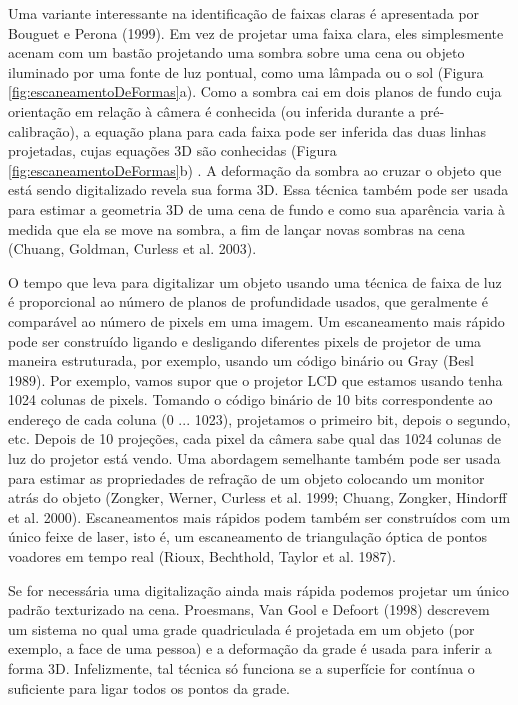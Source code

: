 \documentclass{article}
\begin{document}
Uma variante interessante na identificação de faixas claras é apresentada por Bouguet e Perona (1999). Em vez de projetar uma faixa clara, eles simplesmente acenam com um bastão projetando uma sombra sobre uma cena ou objeto iluminado por uma fonte de luz pontual, como uma lâmpada ou o sol (Figura \ref{fig:escaneamentoDeFormas}a). Como a sombra cai em dois planos de fundo cuja orientação em relação à câmera é conhecida (ou inferida durante a pré-calibração), a equação plana para cada faixa pode ser inferida das duas linhas projetadas, cujas equações 3D são conhecidas (Figura \ref{fig:escaneamentoDeFormas}b) . A deformação da sombra ao cruzar o objeto que está sendo digitalizado revela sua forma 3D. Essa técnica também pode ser usada para estimar a geometria 3D de uma cena de fundo e como sua aparência varia à medida que ela se move na sombra, a fim de lançar novas sombras na cena (Chuang, Goldman, Curless et al. 2003).

O tempo que leva para digitalizar um objeto usando uma técnica de faixa de luz é proporcional ao número de planos de profundidade usados, que geralmente é comparável ao número de pixels em uma imagem. Um escaneamento mais rápido pode ser construído ligando e desligando diferentes pixels de projetor de uma maneira estruturada, por exemplo, usando um código binário ou Gray (Besl 1989). Por exemplo, vamos supor que o projetor LCD que estamos usando tenha 1024 colunas de pixels. Tomando o código binário de 10 bits correspondente ao endereço de cada coluna (0 ... 1023), projetamos o primeiro bit, depois o segundo, etc. Depois de 10 projeções, cada pixel da câmera sabe qual das 1024 colunas de luz do projetor está vendo. Uma abordagem semelhante também pode ser usada para estimar as propriedades de refração de um objeto colocando um monitor atrás do objeto (Zongker, Werner, Curless et al. 1999; Chuang, Zongker, Hindorff et al. 2000). Escaneamentos mais rápidos podem também ser construídos com um único feixe de laser, isto é, um escaneamento de triangulação óptica de pontos voadores em tempo real (Rioux, Bechthold, Taylor et al. 1987).

Se for necessária uma digitalização ainda mais rápida podemos projetar um único padrão texturizado na cena. Proesmans, Van Gool e Defoort (1998) descrevem um sistema no qual uma grade quadriculada é projetada em um objeto (por exemplo, a face de uma pessoa) e a deformação da grade é usada para inferir a forma 3D. Infelizmente, tal técnica só funciona se a superfície for contínua o suficiente para ligar todos os pontos da grade.
\end{document}

